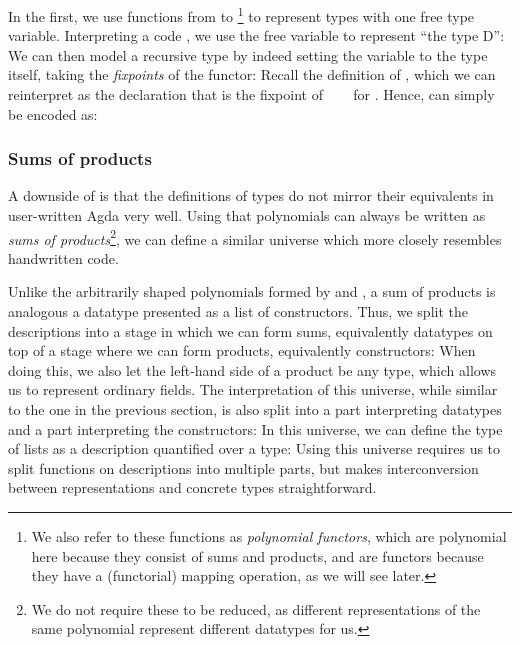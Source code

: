 In the first, we use functions from  to \footnote{We also refer to these functions as \emph{polynomial functors}, which are polynomial here because they consist of sums and products, and are functors because they have a (functorial) mapping operation, as we will see later.} to represent types with one free type variable. Interpreting a code , we use the free variable  to represent ``the type D'':
We can then model a recursive type by indeed setting the variable to the type itself, taking the \emph{fixpoints} of the functor:
Recall the definition of \bN{}, which we can reinterpret as the declaration that  is the fixpoint of \ \ \  for . Hence, \bN{} can simply be encoded as:

\subsubsection{Sums of products}\label{ssec:background-sop}
A downside of  is that the definitions of types do not mirror their equivalents in user-written Agda very well. Using that polynomials can always be written as \emph{sums of products}\footnote{We do not require these to be reduced, as different representations of the same polynomial represent different datatypes for us.}, we can define a similar universe which more closely resembles handwritten code.

Unlike the arbitrarily shaped polynomials formed by  and , a sum of products is analogous a datatype presented as a list of constructors. Thus, we split the descriptions into a stage in which we can form sums, equivalently datatypes
on top of a stage where we can form products, equivalently constructors:
When doing this, we also let the left-hand side of a product be any type, which allows us to represent ordinary fields. The interpretation of this universe, while similar to the one in the previous section, is also split into a part interpreting datatypes
and a part interpreting the constructors:
In this universe, we can define the type of lists as a description quantified over a type:
Using this universe requires us to split functions on descriptions into multiple parts, but makes interconversion between representations and concrete types straightforward.

